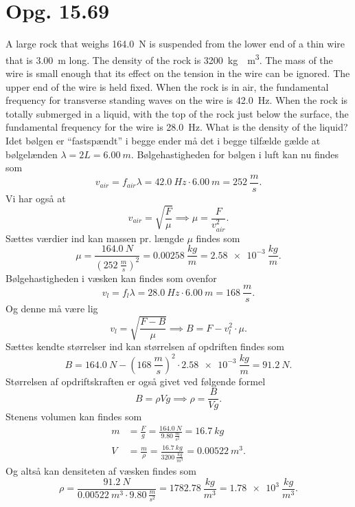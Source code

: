 \documentclass[12pt]{article}
\theoremstyle{definition}
\begin{document}
\section*{Opg. 15.69}
A large rock that weighs \qty{164,0}{N} is suspended from the lower end of a thin wire that is \qty{3,00}{m} long. The density of the rock is \qty{3200}{kg \per m^3}. The mass of the wire is small enough that its effect on the tension in the wire can be ignored. The upper end of the wire is held fixed. When the rock is in air, the fundamental frequency for transverse standing waves on the wire is \qty{42,0}{Hz}. When the rock is totally submerged in a liquid, with the top of the rock just below the surface, the fundamental frequency for the wire is \qty{28,0}{Hz}. What is the density of the liquid?
\bigbreak
Idet bølgen er ``fastspændt'' i begge ender må det i begge tilfælde gælde at bølgelænden $\lambda = 2L = \qty{6,00}{m}$. Bølgehastigheden for bølgen i luft kan nu findes som
\[ 
v_{air} = f_{air}\lambda = \qty{42,0}{Hz} \cdot \qty{6,00}{m} = \qty{252}{\frac{m}{s}} 
.\]
Vi har også at
\[ 
v_{air} = \sqrt{\frac{F}{\mu}} \implies \mu = \frac{F}{v_{air}^2}
.\]
Sættes værdier ind kan massen pr. længde $\mu$ findes som
\[ 
\mu = \frac{\qty{164,0}{N}}{\left( \qty{252}{\frac{m}{s}}  \right)^2} = \qty{0,00258}{\frac{kg}{m}} = \qty{2,58e-3}{\frac{kg}{m}} 
.\]
Bølgehastigheden i væsken kan findes som ovenfor
\[ 
v_{l} = f_l \lambda = \qty{28,0}{Hz} \cdot \qty{6,00}{m} = \qty{168}{\frac{m}{s}} 
.\]
Og denne må være lig
\[ 
v_l = \sqrt{\frac{F-B}{\mu}} \implies B = F- v_l^2 \cdot \mu
.\]
Sættes kendte størrelser ind kan størrelsen af opdriften findes som
\[ 
B = \qty{164,0}{N} - \left( \qty{168}{\frac{m}{s}}  \right)^2 \cdot \qty{2,58e-3}{\frac{kg}{m}} = \qty{91,2}{N}
.\]
Størrelsen af opdriftskraften er også givet ved følgende formel
\[ 
B = \rho V g \implies \rho = \frac{B}{Vg}
.\]
Stenens volumen kan findes som
\begin{align*}
  m &= \frac{F}{g} = \frac{\qty{164,0}{N}}{\qty{9,80}{\frac{m}{s^2}} } = \qty{16,7}{kg} \\ 
  V &= \frac{m}{\rho} = \frac{\qty{16,7}{kg}}{\qty{3200}{\frac{kg}{m^3}} } = \qty{0,00522}{m^3} 
.\end{align*}
Og altså kan densiteten af væsken findes som
\[ 
\rho = \frac{\qty{91,2}{N}}{\qty{0,00522}{m^3} \cdot \qty{9,80}{\frac{m}{s^2}} } = \qty{1782,78}{\frac{kg}{m^3}} = \qty{1,78e3}{\frac{kg}{m^3}} 
.\]
\end{document}
